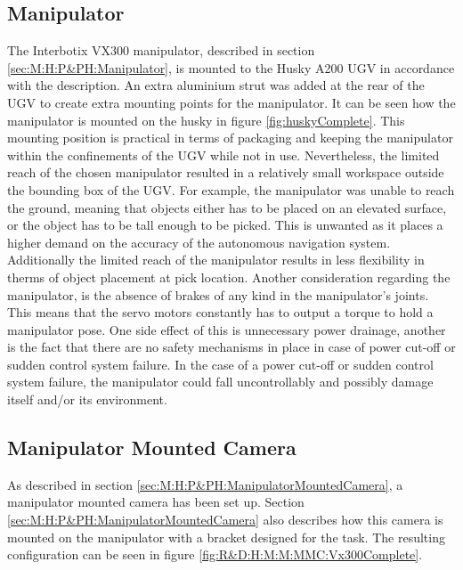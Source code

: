 \subsection{Manipulator}\label{R&G:H:Manipulator}
The Interbotix VX300 manipulator, described in section \ref{sec:M:H:P&PH:Manipulator}, is mounted to the Husky A200 UGV in accordance with the description. An extra aluminium strut was added at the rear of the UGV to create extra mounting points for the manipulator. It can be seen how the manipulator is mounted on the husky in figure \ref{fig:huskyComplete}. 
This mounting position is practical in terms of packaging and keeping the manipulator within the confinements of the UGV while not in use. Nevertheless, the limited reach of the chosen manipulator resulted in a relatively small workspace outside the bounding box of the UGV. For example, the manipulator was unable to reach the ground, meaning that objects either has to be placed on an elevated surface, or the object has to be tall enough to be picked. This is unwanted as it places a higher demand on the accuracy of the autonomous navigation system. Additionally the limited reach of the manipulator results in less flexibility in therms of object placement at pick location.
Another consideration regarding the manipulator, is the absence of brakes of any kind in the manipulator's joints. This means that the servo motors constantly has to output a torque to hold a manipulator pose. One side effect of this is unnecessary power drainage, another is the fact that there are no safety mechanisms in place in case of power cut-off or sudden control system failure. In the case of a power cut-off or sudden control system failure, the manipulator could fall uncontrollably and possibly damage itself and/or its environment.

\subsection{Manipulator Mounted Camera}\label{R&D:H:ManipulatorMountedCamera}
As described in section \ref{sec:M:H:P&PH:ManipulatorMountedCamera}, a manipulator mounted camera has been set up. Section \ref{sec:M:H:P&PH:ManipulatorMountedCamera} also describes how this camera is mounted on the manipulator with a bracket designed for the task. The resulting configuration can be seen in figure \ref{fig:R&D:H:M:M:MMC:Vx300Complete}.

